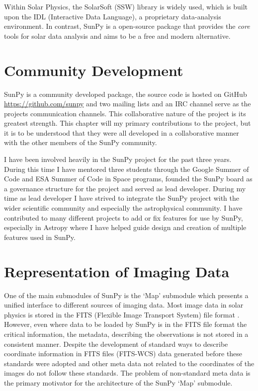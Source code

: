 Within Solar Physics, the SolarSoft (SSW) library \citep{freeland1998} is widely used, which is built upon the IDL (Interactive Data Language), a proprietary data-analysis environment. In contrast, SunPy is a open-source package that provides the \textit{core} tools for solar data analysis and aims to be a free and modern alternative.

\section{Community Development}
SunPy is a community developed package, the source code is hosted on GitHub \url{https://github.com/sunpy} and two mailing lists and an IRC channel serve as the projects communication channels.
This collaborative nature of the project is its greatest strength.
This chapter will my primary contributions to the project, but it is to be understood that they were all developed in a collaborative manner with the other members of the SunPy community.

I have been involved heavily in the SunPy project for the past three years.
During this time I have mentored three students through the Google Summer of Code and ESA Summer of Code in Space programs, founded the SunPy board as a governance structure for the project and served as lead developer.
During my time as lead developer I have strived to integrate the SunPy project with the wider scientific community and especially the astrophysical community.
I have contributed to many different projects to add or fix features for use by SunPy, especially in Astropy where I have helped guide design and creation of multiple features used in SunPy.

\section{Representation of Imaging Data}

One of the main submodules of SunPy is the `Map' submodule which presents a unified interface to different sources of imaging data.
Most image data in solar physics is stored in the FITS (Flexible Image Transport System) file format \citep{pence2010}.
However, even where data to be loaded by SunPy is in the FITS file format the critical information, the metadata, describing the observations is not stored in a consistent manner.
Despite the development of standard ways to describe coordinate information in FITS files (FITS-WCS) \citep{greisen2002,thompson2006} data generated before these standards were adopted and other meta data not related to the coordinates of the images do not follow these standards.
The problem of non-standard meta data is the primary motivator for the architecture of the SunPy `Map' submodule.

